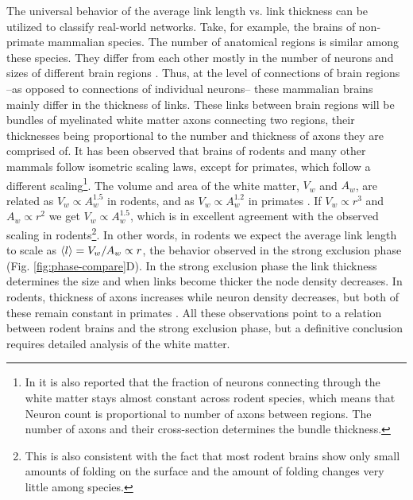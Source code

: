 \documentclass[nofootinbib,preprint,floatfix,titlepage,endfloats]{revtex4} %
\begin{document}
The universal behavior of the average link length vs. link thickness can be utilized to classify real-world networks. 
Take, for example, the brains of non-primate mammalian species. 
The number of anatomical regions is similar among these species. 
They differ from each other mostly in the number of neurons and sizes of different brain regions \cite{azevedo2009equal, herculano2012remarkable, herculano2014brain}. 
Thus, at the level of connections of brain regions --as opposed to connections of individual neurons-- these mammalian brains mainly differ in the thickness of links. 
These links 
between brain regions will be bundles of myelinated white matter axons connecting two regions, their thicknesses being proportional to the number and thickness of axons they are comprised of. 
It has been observed that brains of rodents \cite{herculano2012remarkable} and many other mammals \cite{herculano2014brain} follow isometric scaling laws, except for primates, which follow a different scaling\footnote{In \cite{herculano2012remarkable} it is also reported that the fraction of neurons connecting through the white matter stays almost constant across rodent species, which means that Neuron count is proportional to number of axons between regions. The number of axons and their cross-section determines the bundle thickness.}. 
The volume and area of the white matter, $V_w$ and $A_w$, are related as $V_w\propto A_w^{1.5}$ in rodents, and as $V_w \propto A_w^{1.2}$ in primates  \cite{herculano2012remarkable}. 
If $V_w \propto r^3$ and $A_w \propto r^2$ we get $V_w \propto A_w^{1.5}$, which is in excellent agreement with the observed scaling in rodents\footnote{This is also consistent with the fact that most rodent brains show only small amounts of folding on the surface and the amount of folding changes very little among species.}. In other words, in rodents we expect the average link length to scale as $ \left<l\right> = V_w/A_w \propto r $, the behavior observed in the strong exclusion phase (Fig. \ref{fig:phase-compare}D). 
In the strong exclusion phase the link thickness determines the size and when links become thicker the node density decreases. 
In rodents, thickness of axons increases while neuron density decreases, but both of these remain constant in primates \cite{herculano2012remarkable}. 
All these observations point to a relation between rodent brains and the strong exclusion phase, but a definitive conclusion requires detailed analysis of the white matter. %
\end{document}
